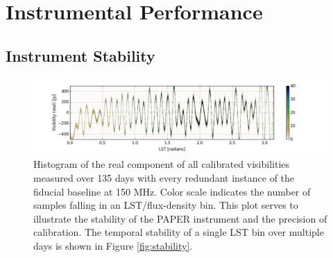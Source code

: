 \documentclass[twocolumn,numberedappendix]{emulateapj} \shorttitle{New Limits on the 21 cm Power Spectrum at $z=8.4$}
\begin{document}

\section{Instrumental Performance}\label{sec:instrument}
\subsection{Instrument Stability}

\begin{figure}
\centering
\includegraphics[width=2.3\columnwidth]{plots/density.png}
\caption{Histogram of the real component of all calibrated visibilities
measured over 135 days with every redundant instance of the fiducial baseline at 150
MHz.  Color scale indicates the number of samples falling in an
LST/flux-density bin.  This plot serves to illustrate the stability of the
PAPER instrument and the precision of calibration.  The temporal stability of
a single LST bin over multiple days is shown in Figure \ref{fig:stability}.
}\label{fig:density}
\end{figure}
\end{document}
